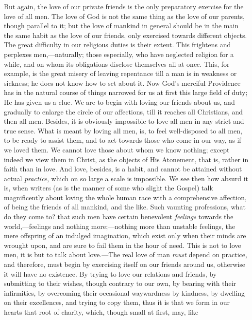 But again, the love of our private friends is the only preparatory
exercise for the love of all men. The love of God is not the same
thing as the love of our parents, though parallel to it; but the love
of mankind in general should be in the main the same habit as the love
of our friends, only exercised towards different objects. The great
difficulty in our religious duties is their extent. This frightens and
perplexes men,—naturally; those especially, who have neglected
religion for a while, and on whom its obligations disclose themselves
all at once. This, for example, is the great misery of leaving
repentance till a man is in weakness or sickness; he does not know how
to set about it. Now God's merciful Providence has in the natural
course of things narrowed for us at first this large field of duty; He
has given us a clue. We are to begin with loving our friends about us,
and gradually to enlarge the circle of our affections, till it reaches
all Christians, and then all men. Besides, it is obviously impossible
to love all men in any strict and true sense. What is meant by loving
all men, is, to feel well-disposed to all men, to be ready to assist
them, and to act towards those who come in our way, as if we loved
them. We cannot love those about whom we know nothing; except indeed
we view them in Christ, as the objects of His Atonement, that is,
rather in faith than in love. And love, besides, is a habit, and
cannot be attained without actual \emph{practice}, which on so large a
scale is impossible. We see then how absurd it is, when writers (as is
the manner of some who slight the Gospel) talk magnificently about
loving the whole human race with a comprehensive affection, of being
the friends of all mankind, and the like. Such vaunting professions,
what do they come to? that such men have certain benevolent \emph{feelings}
towards the world,—feelings and nothing more;—nothing more than
unstable feelings, the mere offspring of an indulged imagination,
which exist only when their minds are wrought upon, and are sure to
fail them in the hour of need. This is not to love men, it is but to
talk about love.—The real love of man \emph{must} depend on
practice, and therefore, must begin by exercising itself on our
friends around us, otherwise it will have no existence. By trying to
love our relations and friends, by submitting to their wishes, though
contrary to our own, by bearing with their infirmities, by overcoming
their occasional waywardness by kindness, by dwelling on their
excellences, and trying to copy them, thus it is that we form in our
hearts that root of charity, which, though small at first, may, like
